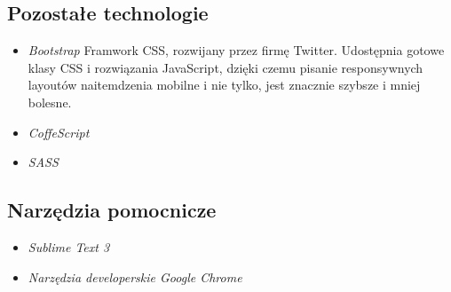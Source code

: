   \subsection{Pozostałe technologie}
    \begin{itemize}
      \item \emph{Bootstrap}
        Framwork CSS, rozwijany przez firmę Twitter. Udostępnia gotowe klasy CSS i rozwiązania JavaScript, dzięki czemu pisanie responsywnych layoutów naitemdzenia mobilne i nie tylko, jest znacznie szybsze i mniej bolesne.
      \item \emph{CoffeScript}
      \item \emph{SASS}
    \end{itemize}
  \subsection{Narzędzia pomocnicze}
    \begin{itemize}
      \item \emph{Sublime Text 3}
      \item \emph{Narzędzia developerskie Google Chrome}
    \end{itemize}
